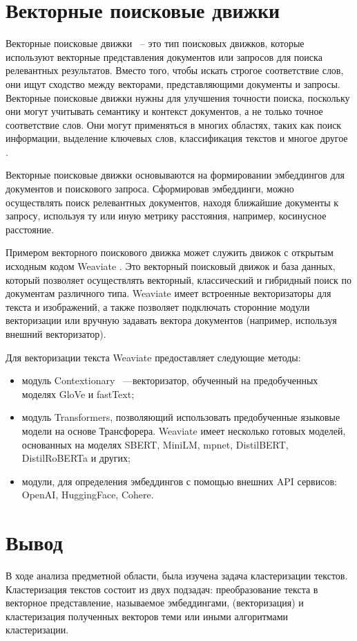\section{Векторные поисковые движки}
Векторные поисковые движки ~-- это тип поисковых движков, которые используют векторные представления документов или запросов для поиска релевантных результатов. Вместо того, чтобы искать строгое соответствие слов, они ищут сходство между векторами, представляющими документы и запросы. Векторные поисковые движки нужны для улучшения точности поиска, поскольку они могут учитывать семантику и контекст документов, а не только точное соответствие слов. Они могут применяться в многих областях, таких как поиск информации, выделение ключевых слов, классификация текстов и многое другое \cite{vector-search}.

Векторные поисковые движки основываются на формировании эмбеддингов для документов и поискового запроса. Сформировав эмбеддинги, можно осуществлять поиск релевантных документов, находя ближайшие документы к запросу, используя ту или иную метрику расстояния, например, косинусное расстояние.

Примером векторного поискового движка может служить движок с открытым исходным кодом Weaviate \cite{weaviate}. Это векторный поисковый движок и база данных, который позволяет осуществлять векторный, классический и гибридный поиск по документам различного типа. Weaviate имеет встроенные векторизаторы для текста и изображений, а также позволяет подключать сторонние модули векторизации или вручную задавать вектора документов (например, используя внешний векторизатор).

Для векторизации текста Weaviate предоставляет следующие методы:
\begin{itemize}
    \item модуль Contextionary ~---векторизатор, обученный на предобученных моделях GloVe и fastText;
    \item модуль Transformers, позволяющий использовать предобученные языковые модели на основе Трансфорера. Weaviate имеет несколько готовых моделей, основанных на моделях SBERT, MiniLM, mpnet, DistilBERT, DistilRoBERTa и других;
    \item модули, для определения эмбеддингов с помощью внешних API сервисов: OpenAI, HuggingFace, Cohere.
\end{itemize}

\section{Вывод}
В ходе анализа предметной области, была изучена задача кластеризации текстов. Кластеризация текстов состоит из двух подзадач: преобразование текста в векторное представление, называемое эмбеддингами, (векторизация) и кластеризация полученных векторов теми или иными алгоритмами кластеризации.


